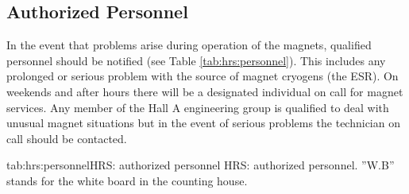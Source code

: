 
\begin{safetyen}{10}{15}
\subsection{Authorized Personnel}
\end{safetyen}

In the event that problems arise during 
operation of the magnets, qualified personnel should be notified
(see Table \ref{tab:hrs:personnel}).  
This includes any prolonged or serious problem with the source of magnet 
cryogens (the ESR).  On weekends and after hours there will be a 
designated individual on call for magnet services.  Any member of the 
Hall A engineering group is qualified to deal with unusual magnet 
situations but in the event of serious problems the technician on
call should be contacted.

\begin{namestab}{tab:hrs:personnel}{HRS: authorized personnel}{%
      HRS: authorized personnel. ''W.B'' stands for the white board 
      in the counting house.}
   \EdFolts{}
   \ScotSpiegel{}
   \MarkStevens{}
   \GaryDezern{}
\end{namestab}


